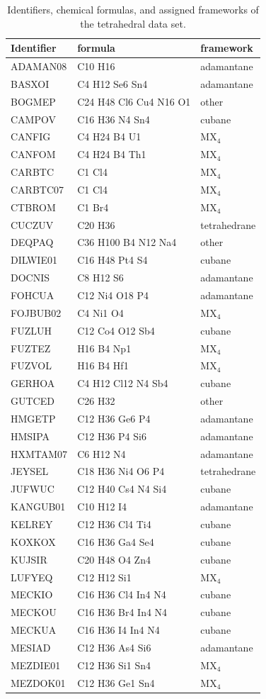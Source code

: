 \documentclass[preprint]{revtex4}              %
\begin{document}
\begin{table}
\caption{Identifiers, chemical formulas, and assigned frameworks of
the tetrahedral data set.}\label{names1} \tiny
\begin{tabular}{lll}
Identifier & formula & framework\\
\hline
ADAMAN08 & C10 H16 & adamantane \\
BASXOI & C4 H12 Se6 Sn4 & adamantane \\
BOGMEP & C24 H48 Cl6 Cu4 N16 O1 & other \\
CAMPOV & C16 H36 N4 Sn4 & cubane\\
CANFIG & C4 H24 B4 U1 & MX$_4$\\
CANFOM & C4 H24 B4 Th1 & MX$_4$\\
CARBTC & C1 Cl4 & MX$_4$\\
CARBTC07 & C1 Cl4 & MX$_4$\\
CTBROM & C1 Br4 & MX$_4$\\
CUCZUV & C20 H36 & tetrahedrane\\
DEQPAQ & C36 H100 B4 N12 Na4 & other\\
DILWIE01 & C16 H48 Pt4 S4 & cubane\\
DOCNIS & C8 H12 S6 & adamantane\\
FOHCUA & C12 Ni4 O18 P4 & adamantane\\
FOJBUB02 & C4 Ni1 O4 & MX$_4$\\
FUZLUH & C12 Co4 O12 Sb4 & cubane\\
FUZTEZ & H16 B4 Np1 & MX$_4$\\
FUZVOL & H16 B4 Hf1 & MX$_4$\\
GERHOA & C4 H12 Cl12 N4 Sb4 & cubane\\
GUTCED & C26 H32 & other\\
HMGETP & C12 H36 Ge6 P4 & adamantane\\
HMSIPA & C12 H36 P4 Si6 & adamantane\\
HXMTAM07 & C6 H12 N4 & adamantane\\
JEYSEL & C18 H36 Ni4 O6 P4 & tetrahedrane\\
JUFWUC & C12 H40 Cs4 N4 Si4 & cubane\\
KANGUB01 & C10 H12 I4 & adamantane\\
KELREY & C12 H36 Cl4 Ti4 & cubane\\
KOXKOX & C16 H36 Ga4 Se4 & cubane\\
KUJSIR & C20 H48 O4 Zn4 & cubane\\
LUFYEQ & C12 H12 Si1 & MX$_4$\\
MECKIO & C16 H36 Cl4 In4 N4 & cubane\\
MECKOU & C16 H36 Br4 In4 N4 & cubane\\
MECKUA & C16 H36 I4 In4 N4 & cubane\\
MESIAD & C12 H36 As4 Si6 & adamantane\\
MEZDIE01 & C12 H36 Si1 Sn4 & MX$_4$\\
MEZDOK01 & C12 H36 Ge1 Sn4 & MX$_4$
\end{tabular}
\end{table}
\end{document}
